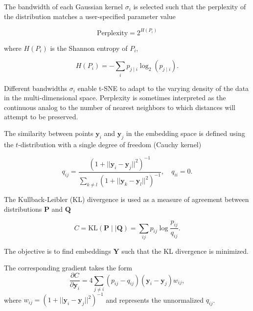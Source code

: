 \documentclass[twocolumn]{article}
\begin{document}
The bandwidth of each Gaussian kernel $\sigma_i$ is selected such that the
perplexity of the distribution matches a user-specified parameter value

\begin{equation}
\text{Perplexity} = 2^{H(P_i)}
\end{equation}

\noindent where $H(P_i)$ is the Shannon entropy of $P_i$,

\begin{equation}
H(P_i) = -\sum_i p_{j \mid i} \log_2 (p_{j \mid i}).
\end{equation}

\noindent Different bandwidths $\sigma_i$ enable t-SNE to adapt to the varying
density of the data in the multi-dimensional space. Perplexity is sometimes
interpreted as the continuous analog to the number of nearest neighbors to which
distances will attempt to be preserved. 

The similarity between points $\mathbf{y}_i$ and $\mathbf{y}_j$ in the
embedding space is defined using the $t$-distribution with a single degree of
freedom (Cauchy kernel)

\begin{equation}
q_{ij} = \frac{\left ( 1 + || \mathbf{y}_i - \mathbf{y}_j ||^2 \right )^{-1}}
{\sum_{k \neq l}\left ( 1 + || \mathbf{y}_k - \mathbf{y}_l ||^2 \right )^{-1}},
\quad q_{ii} = 0.
\label{eq:cauchy_kernel}
\end{equation}

The Kullback-Leibler (KL) divergence is used as a measure of agreement
between distributions $\mathbf{P}$ and $\mathbf{Q}$

\begin{equation}
C = \text{KL}(\mathbf{P} \mid \mid \mathbf{Q}) = \sum_{ij} p_{ij} \log \frac{p_{ij}}{q_{ij}}.
\label{eq:kl_divergence}
\end{equation}

\noindent The objective is to find embeddings $\mathbf{Y}$ such that the
KL divergence is minimized.

The corresponding gradient takes the form
\begin{equation}
\frac{\partial C}{\partial \mathbf{y}_i} = 4 \sum_{j \neq i} \left ( p_{ij} - q_{ij} \right ) \left ( \mathbf{y}_i - \mathbf{y}_j \right ) w_{ij},
\label{eq:tsne_gradient}
\end{equation}
where $w_{ij} = \left ( 1 + || \mathbf{y}_i - \mathbf{y}_j || ^2 \right )^{-1}$
and represents the unnormalized $q_{ij}$.
\end{document}
